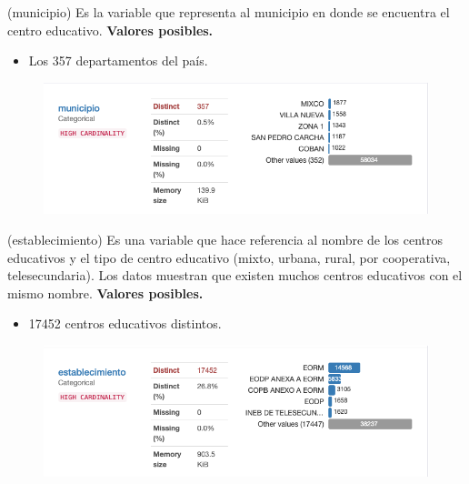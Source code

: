 \begin{variable}(municipio) 
Es la variable que representa al municipio en donde se encuentra el centro educativo.
\bigbreak 
\textbf{Valores posibles.}
\begin{itemize}
	\item Los 357 departamentos del país. 
\end{itemize}
\begin{figure}[H]
	\centering
	\includegraphics[scale=0.5]{Images/4}
\end{figure}
\end{variable}


\begin{variable}(establecimiento) 
	Es una variable que hace referencia al nombre de los centros educativos y el tipo de centro educativo (mixto, urbana, rural, por cooperativa, telesecundaria). Los datos muestran que existen muchos centros educativos con el mismo nombre. 
\bigbreak 
\textbf{Valores posibles.}
\begin{itemize}
	\item 17452 centros educativos distintos. 
\end{itemize}
\begin{figure}[H]
	\centering
	\includegraphics[scale=0.5]{Images/5}
\end{figure}
\end{variable}


